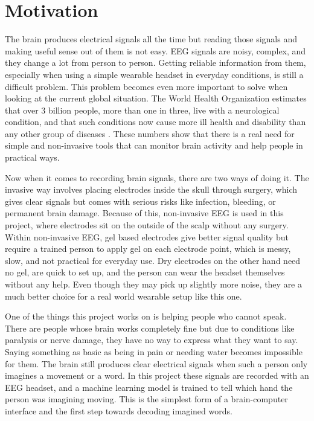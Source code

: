 \section{Motivation}
The brain produces electrical signals all the time but reading those signals and making useful sense out of them is not easy. EEG signals are noisy, complex, and they change a lot from person to person. Getting reliable information from them, especially when using a simple wearable headset in everyday conditions, is still a difficult problem. This problem becomes even more important to solve when looking at the current global situation. The World Health Organization estimates that over 3 billion people, more than one in three, live with a neurological condition, and that such conditions now cause more ill health and disability than any other group of diseases \cite{who2024neuro}. These numbers show that there is a real need for simple and non-invasive tools that can monitor brain activity and help people in practical ways.

Now when it comes to recording brain signals, there are two ways of doing it. The invasive way involves placing electrodes inside the skull through surgery, which gives clear signals but comes with serious risks like infection, bleeding, or permanent brain damage. Because of this, non-invasive EEG is used in this project, where electrodes sit on the outside of the scalp without any surgery. Within non-invasive EEG, gel based electrodes give better signal quality but require a trained person to apply gel on each electrode point, which is messy, slow, and not practical for everyday use. Dry electrodes on the other hand need no gel, are quick to set up, and the person can wear the headset themselves without any help. Even though they may pick up slightly more noise, they are a much better choice for a real world wearable setup like this one.

One of the things this project works on is helping people who cannot speak. There are people whose brain works completely fine but due to conditions like paralysis or nerve damage, they have no way to express what they want to say. Saying something as basic as being in pain or needing water becomes impossible for them. The brain still produces clear electrical signals when such a person only imagines a movement or a word. In this project these signals are recorded with an EEG headset, and a machine learning model is trained to tell which hand the person was imagining moving. This is the simplest form of a brain-computer interface and the first step towards decoding imagined words.

